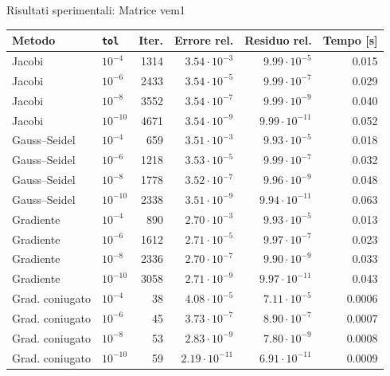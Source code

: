 \documentclass[11pt,aspectratio=169,xcolor=dvipsnames]{beamer}
\begin{document}
\begin{frame}{Risultati sperimentali: Matrice vem1}
    \begin{table}
        \centering
        \scriptsize
        \begin{tabular}{llrrrr}
        \toprule
        Metodo & \texttt{tol} & Iter. & Errore rel. & Residuo rel. & Tempo [s] \\
        \midrule
        Jacobi & $10^{-4}$ & 1314 & $3.54\cdot10^{-3}$ & $9.99\cdot10^{-5}$ & 0.015 \\
        Jacobi & $10^{-6}$ & 2433 & $3.54\cdot10^{-5}$ & $9.99\cdot10^{-7}$ & 0.029 \\
        Jacobi & $10^{-8}$ & 3552 & $3.54\cdot10^{-7}$ & $9.99\cdot10^{-9}$ & 0.040 \\
        Jacobi & $10^{-10}$ & 4671 & $3.54\cdot10^{-9}$ & $9.99\cdot10^{-11}$ & 0.052 \\
        \midrule
        Gauss--Seidel & $10^{-4}$ & 659 & $3.51\cdot10^{-3}$ & $9.93\cdot10^{-5}$ & 0.018 \\
        Gauss--Seidel & $10^{-6}$ & 1218 & $3.53\cdot10^{-5}$ & $9.99\cdot10^{-7}$ & 0.032 \\
        Gauss--Seidel & $10^{-8}$ & 1778 & $3.52\cdot10^{-7}$ & $9.96\cdot10^{-9}$ & 0.048 \\
        Gauss--Seidel & $10^{-10}$ & 2338 & $3.51\cdot10^{-9}$ & $9.94\cdot10^{-11}$ & 0.063 \\
        \midrule
        Gradiente & $10^{-4}$ & 890 & $2.70\cdot10^{-3}$ & $9.93\cdot10^{-5}$ & 0.013 \\
        Gradiente & $10^{-6}$ & 1612 & $2.71\cdot10^{-5}$ & $9.97\cdot10^{-7}$ & 0.023 \\
        Gradiente & $10^{-8}$ & 2336 & $2.70\cdot10^{-7}$ & $9.90\cdot10^{-9}$ & 0.033 \\
        Gradiente & $10^{-10}$ & 3058 & $2.71\cdot10^{-9}$ & $9.97\cdot10^{-11}$ & 0.043 \\
        \midrule
        Grad. coniugato & $10^{-4}$ & 38 & $4.08\cdot10^{-5}$ & $7.11\cdot10^{-5}$ & 0.0006 \\
        Grad. coniugato & $10^{-6}$ & 45 & $3.73\cdot10^{-7}$ & $8.90\cdot10^{-7}$ & 0.0007 \\
        Grad. coniugato & $10^{-8}$ & 53 & $2.83\cdot10^{-9}$ & $7.80\cdot10^{-9}$ & 0.0008 \\
        Grad. coniugato & $10^{-10}$ & 59 & $2.19\cdot10^{-11}$ & $6.91\cdot10^{-11}$ & 0.0009 \\
        \bottomrule
        \end{tabular}
    \end{table}
\end{frame}
\end{document}
